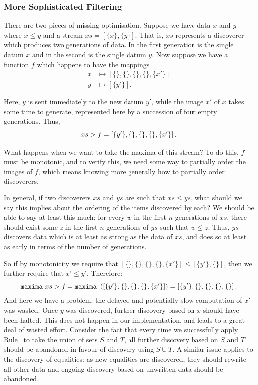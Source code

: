 \subsubsection{More Sophisticated Filtering}
There are two pieces of missing optimisation. Suppose we have data $x$ and $y$ where $x \leq y$ and a stream $xs = \left[\{x\}, \{y\}\right].$ That is, $xs$ represents a discoverer which produces two generations of data. In the first generation is the single datum $x$ and in the second is the single datum $y$. Now suppose we have a function $f$ which happens to have the mappings
\begin{align*}
x &\mapsto \left[\{\},\{\},\{\},\{\},\{x'\}\right]\\
y &\mapsto \left[\{y'\}\right].
\end{align*}

Here, $y$ is sent immediately to the new datum $y'$, while the image $x'$ of $x$ takes some time to generate, represented here by a succession of four empty generations. Thus,
\begin{displaymath}
xs \vartriangleright f = \left[\{y'\}, \{\}, \{\}, \{\}, \{x'\}\right].
\end{displaymath}

What happens when we want to take the maxima of this stream? To do this, $f$ must be monotonic, and to verify this, we need some way to partially order the images of $f$, which means knowing more generally how to partially order discoverers.

In general, if two discoverers $xs$ and $ys$ are such that $xs \leq ys$, what should we say this implies about the ordering of the items discovered by each? We should be able to say at least this much: for every $w$ in the first $n$ generations of $xs$, there should exist some $z$ in the first $n$ generations of $ys$ such that $w \leq z$. Thus, $ys$ discovers data which is at least as strong as the data of $xs$, and does so at least as early in terms of the number of generations.

So if by monotonicity we require that $\left[\{\},\{\},\{\},\{\},\{x'\}\right] \leq \left[\{y'\},\{\}\right]$, then we further require that $x' \leq y'$. Therefore:
\begin{displaymath}
\texttt{maxima}\ xs \vartriangleright f = \texttt{maxima}\ \left(\left[\{y'\}, \{\}, \{\}, \{\}, \{x'\}\right]\right) = \left[\{y'\}, \{\}, \{\}, \{\}, \{\}\right].
\end{displaymath}
And here we have a problem: the delayed and potentially slow computation of $x'$ was wasted. Once $y$ was discovered, further discovery based on $x$ should have been halted. This does not happen in our implementation, and leads to a great deal of wasted effort. Consider the fact that every time we successfully apply Rule~ to take the union of sets $S$ and $T$, all further discovery based on $S$ and $T$ should be abandoned in favour of discovery using $S \cup T$. A similar issue applies to the discovery of equalities: as new equalities are discovered, they should rewrite all other data and ongoing discovery based on unwritten data should be abandoned.

